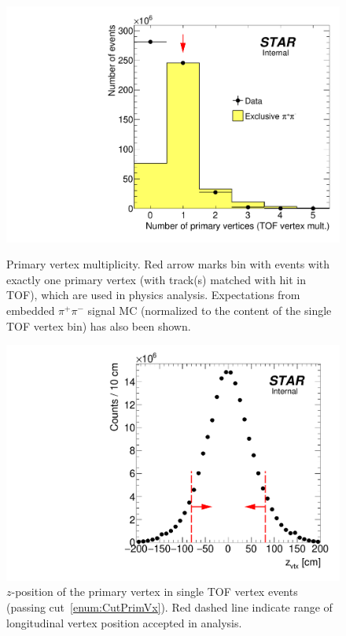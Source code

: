 \begin{figure}[ht!]%
\centering%
\begin{minipage}{.4725\textwidth}%
  \centering%
  \includegraphics[width=\linewidth]{graphics/eventSelection/NumberOfPrimaryVertices.pdf}%
  \caption{Primary vertex multiplicity. Red arrow marks bin with events with exactly one primary vertex (with track(s) matched with hit in TOF), which are used in physics analysis. Expectations from embedded $\pi^{+}\pi^{-}$ signal MC (normalized to the content of the single TOF vertex bin) has also been shown.}\label{fig:NumberOfPrimaryVertices}
\end{minipage}%
\quad\quad%
\begin{minipage}{.4725\textwidth}%
  \centering
  \includegraphics[width=\linewidth]{graphics/eventSelection/zVertex_oneTof.pdf}%
  \caption{\texorpdfstring{$z$}{z}-position of the primary vertex in single TOF vertex events (passing cut~\ref{enum:CutPrimVx}). Red dashed line indicate range of longitudinal vertex position accepted in analysis.\newline\newline}\label{fig:zVertexTpc}
\end{minipage}%
\end{figure}%


